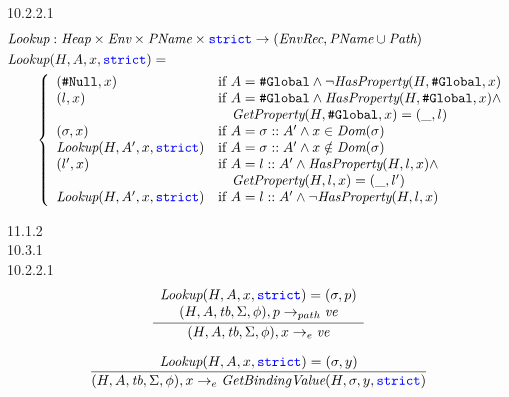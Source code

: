 \documentclass[a4paper]{article}
\newcommand{\code}[1]{\textcolor{blue}{\tt #1}}
\newcommand{\If}{\mbox{if}}
\newcommand{\tb}{\emph{tb}}
\begin{document}
10.2.2.1
\begin{equation*}
\begin{split}
& \emph{Lookup} : \emph{Heap} \times \emph{Env} \times \emph{PName} \times \code{strict} \rightarrow (\emph{EnvRec}, \emph{PName} \cup \emph{Path}) \\
& \emph{Lookup} (H, A, x, \code{strict}) = \\
&\qquad \left\{\begin{array}{ll}
(\texttt{\#Null}, x) & \If\ A = \texttt{\#Global} \wedge \neg \emph{HasProperty} (H, \texttt{\#Global}, x) \\
(l, x) & \If\ A = \texttt{\#Global} \wedge \emph{HasProperty} (H, \texttt{\#Global}, x) \wedge \\
  & \quad \emph{GetProperty} (H, \texttt{\#Global}, x) = (\_, l) \\
(\sigma, x) & \If\ A = \sigma :: A' \wedge x \in \emph{Dom} (\sigma) \\
\emph{Lookup} (H, A', x, \code{strict}) & \If\ A = \sigma :: A' \wedge x \notin \emph{Dom} (\sigma) \\
(l', x) & \If\ A = l :: A' \wedge \emph{HasProperty} (H, l, x) \wedge \\
  & \quad \emph{GetProperty} (H, l, x) = (\_, l') \\
\emph{Lookup} (H, A', x, \code{strict}) & \If\ A = l :: A' \wedge \neg \emph{HasProperty} (H, l, x) \\
\end{array}\right.
\end{split}
\end{equation*}

11.1.2 \\
10.3.1 \\
10.2.2.1
\begin{equation*}
\frac{
    \begin{array}{c}
    \emph{Lookup} (H, A, x, \code{strict}) = (\sigma, p) \\
    (H, A, \tb, \Sigma, \phi), p \rightarrow_{path} \emph{ve}
    \end{array}
}{
    (H, A, \tb, \Sigma, \phi), x \rightarrow_e \emph{ve}
}
\end{equation*}

\begin{equation*}
\frac{
    \emph{Lookup} (H, A, x, \code{strict}) = (\sigma, y)
}{
    (H, A, \tb, \Sigma, \phi), x \rightarrow_e \emph{GetBindingValue} (H, \sigma, y, \code{strict})
}
\end{equation*}
\end{document}
